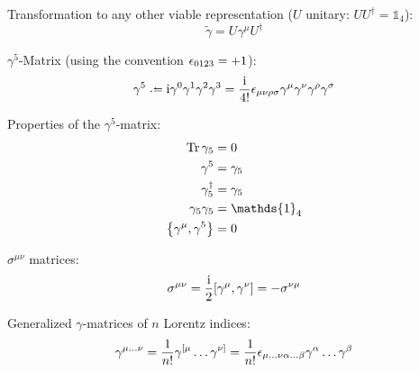 			\noindent
			Transformation to any other viable representation ($U$ unitary: $U U^\dagger=\mathds{1}_4$):
			\begin{equation}
				\tilde{\gamma} = U \gamma^\mu U^\dagger
			\end{equation}

			\noindent
			$\gamma^5$-Matrix (using the convention $\epsilon_{0123} = +1$):
			\begin{equation}
				\gamma^5 \defeq \i\gamma^0 \gamma^1 \gamma^2 \gamma^3
				= \frac{\i}{4!}\levicivita_{\mu\nu\rho\sigma} \gamma^\mu \gamma^\nu \gamma^\rho \gamma^\sigma
			\end{equation}

			\noindent
			Properties of the $\gamma^5$-matrix:
			\begin{align}
				\tr \gamma_5 &= 0 \\
				\gamma^5 &= \gamma_5 \\
				\gamma_5^\dagger &= \gamma_5 \\
				\gamma_5 \gamma_5 &= \mathds{1}_4 \\
				\acomm{\gamma^\mu}{\gamma^5} &= 0
			\end{align}

			\noindent
			$\sigma^{\mu\nu}$ matrices:
			\begin{equation}
				\sigma^{\mu\nu} = \frac{\i}{2}\comm{\gamma^\mu}{\gamma^\nu} = -\sigma^{\nu\mu}
			\end{equation}

			\noindent
			Generalized $\gamma$-matrices of $n$ Lorentz indices:
			\begin{equation}
				\gamma^{\mu\dots\nu} = \frac{1}{n!} \gamma^{[\mu} \dots \gamma^{\nu]}
				= \frac{1}{n!}\epsilon_{\mu\dots\nu\alpha\dots\beta} \gamma^\alpha \dots \gamma^\beta
			\end{equation}

